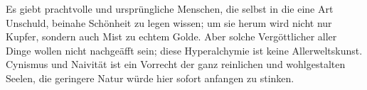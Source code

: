 Es giebt prachtvolle und ursprüngliche Menschen, die selbst in die  eine Art Unschuld, beinahe Schönheit zu legen wissen; um sie herum wird nicht nur Kupfer, sondern auch Mist zu echtem Golde. Aber solche Vergöttlicher aller Dinge wollen nicht nachgeäfft sein; diese Hyperalchymie ist keine Allerweltskunst. Cynismus und Naivität ist ein Vorrecht der ganz reinlichen und wohlgestalten Seelen, die geringere Natur würde hier sofort anfangen zu stinken.
\par

